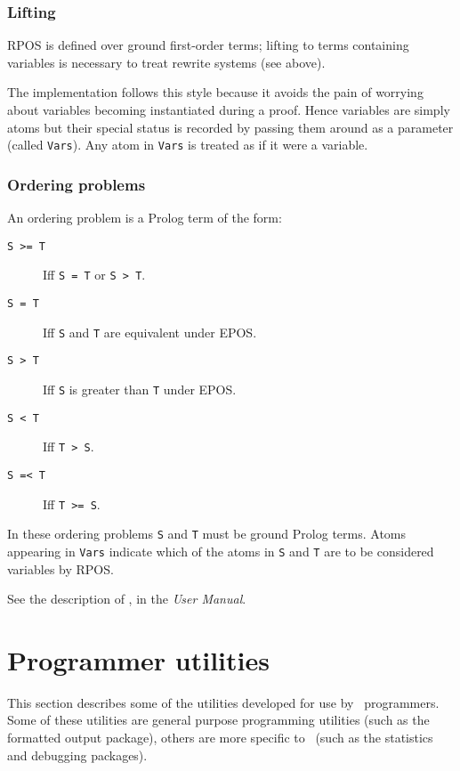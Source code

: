 \subsection {Lifting}

RPOS is defined over ground first-order terms; lifting to terms
containing variables is necessary to treat rewrite systems (see
above).

The implementation follows this style because it avoids the pain of
worrying about variables becoming instantiated during a proof.
Hence variables are simply atoms but their special status is recorded
by passing them around as a parameter (called {\tt Vars}).  Any atom
in {\tt Vars} is treated as if it were a variable.


\subsection {Ordering problems}
\label{ordprob}
An ordering problem is a Prolog term of the form:
\begin{description}
\item [{\tt S >= T}] Iff  {\tt S = T}  or {\tt S > T}.
\item [{\tt S = T}] Iff {\tt S} and {\tt T} are equivalent under EPOS.
\item [{\tt S > T}] Iff {\tt S} is greater than {\tt T} under EPOS.
\item [{\tt S < T}] Iff {\tt T > S}.
\item [{\tt S =< T}] Iff {\tt T >= S}.
\end{description}
In these ordering problems {\tt S} and {\tt T} must be ground Prolog
terms.   Atoms appearing in {\tt Vars} indicate which of the atoms in
{\tt S} and {\tt T} are to be considered variables by RPOS.

See the description of ,  in the
{\em User Manual}.



\chapter [Utilities]{Programmer utilities}
\label{programmer-utils}

This section describes some of the utilities developed for use by
\clam\ programmers. Some of these utilities are general purpose
programming utilities (such as the formatted output package), others
are more specific to \clam\ (such as the statistics and debugging
packages).

